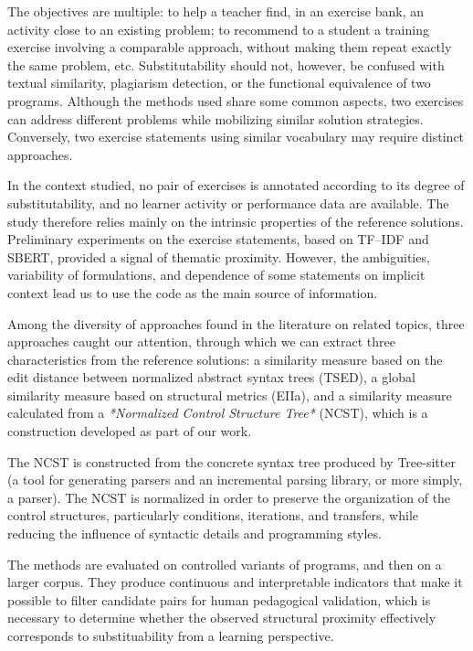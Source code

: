 \documentclass[12pt,a4paper,oneside]{report}
\begin{document}
The objectives are multiple: to help a teacher find, in an exercise bank, an activity 
close to an existing problem; to recommend to a student a training exercise involving a comparable approach, without making them repeat exactly the same problem, etc. Substitutability should not, however, be confused with textual similarity, plagiarism detection, or the functional equivalence of two programs. Although the methods used share some common aspects, two exercises can address different problems while mobilizing similar solution strategies. Conversely, two exercise statements using similar vocabulary may require distinct approaches.

In the context studied, no pair of exercises is annotated according to its degree of 
substitutability, and no learner activity or performance data are available. The study 
therefore relies mainly on the intrinsic properties of the reference solutions. Preliminary experiments on the exercise statements, based on TF--IDF and SBERT, provided a signal of thematic proximity. However, the ambiguities, variability of formulations, and dependence of some statements on implicit context lead us to use the code as the main source of information.

Among the diversity of approaches found in the literature on related topics, 
three approaches caught our attention, through which we can extract three 
characteristics from the reference solutions: a similarity measure based on the edit distance between normalized abstract syntax trees (TSED), a global similarity measure based on structural metrics (EIIa), and a similarity measure calculated from a \emph{*Normalized Control Structure Tree*} (NCST), which is a construction developed as part of our work.

The NCST is constructed from the concrete syntax tree produced by 
Tree-sitter (a tool for generating parsers and an incremental parsing 
library, or more simply, a parser). The NCST is normalized in order to
preserve the organization of the control structures, particularly conditions,
iterations, and transfers, while reducing the influence of syntactic details 
and programming styles.

The methods are evaluated on controlled variants of programs, and then on a 
larger corpus. They produce continuous and interpretable indicators that make it possible to filter candidate pairs for human pedagogical validation, which is necessary to determine whether the observed structural proximity effectively corresponds to substituability from a learning perspective.
\end{document}

